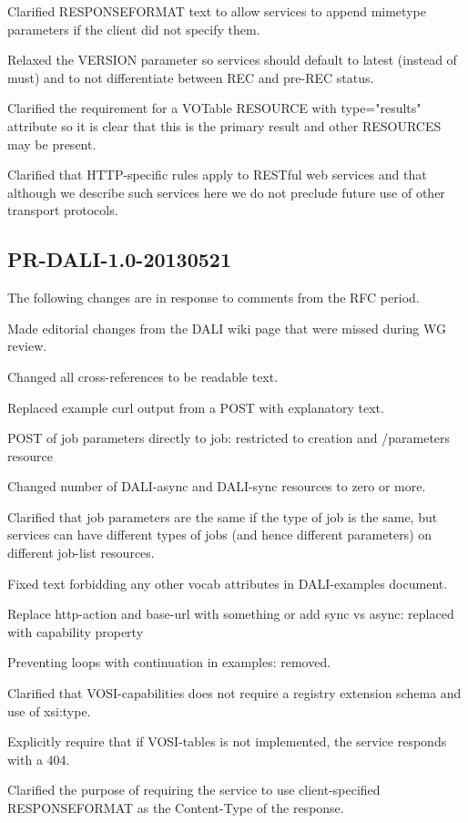 \documentclass[11pt,letter]{ivoa}
\begin{document}
Clarified RESPONSEFORMAT text to allow services to append mimetype parameters if 
the client did not specify them.

Relaxed the VERSION parameter so services should default to latest (instead of 
must) and to not differentiate between REC and pre-REC status.

Clarified the requirement for a VOTable RESOURCE with type="results" attribute 
so it is clear that this is the primary result and other RESOURCES may be 
present.

Clarified that HTTP-specific rules apply to RESTful web services and that 
although we describe such services here we do not preclude future use of other 
transport protocols.

\subsection{PR-DALI-1.0-20130521}
The following changes are in response to comments from the RFC period.

Made editorial changes from the DALI wiki page that were missed during WG 
review.

Changed all cross-references to be readable text.

Replaced example curl output from a POST with explanatory text.

POST of job parameters directly to job: restricted to creation and /parameters 
resource

Changed number of DALI-async and DALI-sync resources to zero or more.

Clarified that job parameters are the same if the type of job is the same, but 
services can have different types of jobs (and hence different parameters) on 
different job-list resources.

Fixed text forbidding any other vocab attributes in DALI-examples document.

Replace http-action and base-url with something or add sync vs async: replaced 
with capability property

Preventing loops with continuation in examples: removed.

Clarified that VOSI-capabilities does not require a registry extension schema 
and use of xsi:type.

Explicitly require that if VOSI-tables is not implemented, the service responds 
with a 404.

Clarified the purpose of requiring the service to use client-specified 
RESPONSEFORMAT as the Content-Type of the response.
\end{document}
